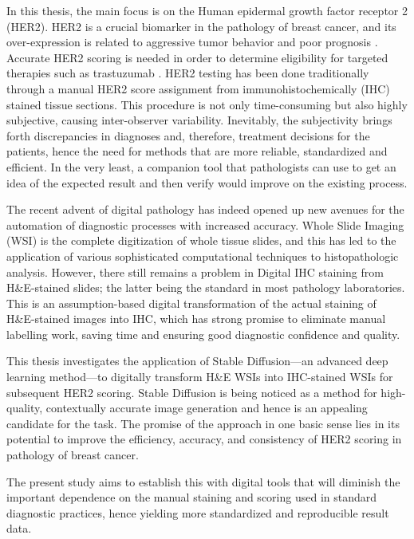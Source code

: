 In this thesis, the main focus is on the Human epidermal growth factor receptor 2 (HER2). HER2 is a crucial biomarker in the pathology of breast cancer, and its over-expression is related to aggressive tumor behavior and poor prognosis \parencite{Slamon1987HumanOncogene}. Accurate HER2 scoring is needed in order to determine eligibility for targeted therapies such as trastuzumab \parencite{Slamon2001UseHER2}. HER2 testing has been done traditionally through a manual HER2 score assignment from immunohistochemically (IHC) stained tissue sections. This procedure is not only time-consuming but also highly subjective, causing inter-observer variability. Inevitably, the subjectivity brings forth discrepancies in diagnoses and, therefore, treatment decisions for the patients, hence the need for methods that are more reliable, standardized and efficient. In the very least, a companion tool that pathologists can use to get an idea of the expected result and then verify would improve on the existing process. 

The recent advent of digital pathology has indeed opened up new avenues for the automation of diagnostic processes with increased accuracy. Whole Slide Imaging (WSI) is the complete digitization of whole tissue slides, and this has led to the application of various sophisticated computational techniques to histopathologic analysis. However, there still remains a problem in Digital IHC staining from H\&E-stained slides; the latter being the standard in most pathology laboratories. This is an assumption-based digital transformation of the actual staining of H\&E-stained images into IHC, which has strong promise to eliminate manual labelling work, saving time and ensuring good diagnostic confidence and quality.

This thesis investigates the application of Stable Diffusion—an advanced deep learning method—to digitally transform H\&E WSIs into IHC-stained WSIs for subsequent HER2 scoring. Stable Diffusion is being noticed as a method for high-quality, contextually accurate image generation and hence is an appealing candidate for the task. The promise of the approach in one basic sense lies in its potential to improve the efficiency, accuracy, and consistency of HER2 scoring in pathology of breast cancer.

The present study aims to establish this with digital tools that will diminish the important dependence on the manual staining and scoring used in standard diagnostic practices, hence yielding more standardized and reproducible result data.

